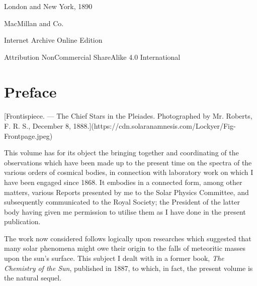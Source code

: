 \documentclass[a4paper, 12pt, oneside, polutonikogreek, english]{article}
\begin{document}
\begin{titlepage}
	
	
		
	\vspace*{\fill}%
	
	London and New York, 1890 %
	
	{\small MacMillan and Co.} %

	\vspace{1\baselineskip} %

        Internet Archive Online Edition  %
	
	{\small Attribution NonCommercial ShareAlike 4.0 International } %
\end{titlepage}
\setlength{\parskip}{1mm plus1mm minus1mm}
\setcounter{tocdepth}{3}
\setcounter{secnumdepth}{3}
\tableofcontents
\clearpage
\listoffigures{}
\clearpage
\section*{Preface}
\paragraph{}
[Frontispiece. --- The Chief Stars in the Pleiades. Photographed by Mr. Roberts, F. R. S., December 8, 1888.](https://cdn.solaranamnesis.com/Lockyer/Fig-Frontpage.jpeg)

This volume has for its object the bringing together and coordinating of the observations which have been made up to the present time on the spectra of the various orders of cosmical bodies, in connection with laboratory work on which I have been engaged since 1868. It embodies in a connected form, among other matters, various Reports presented by me to the Solar Physics Committee, and subsequently communicated to the Royal Society; the President of the latter body having given me permission to utilise them as I have done in the present publication.

The work now considered follows logically upon researches which suggested that many solar phenomena might owe their origin to the falls of meteoritic masses upon the sun's surface. This subject I dealt with in a former book, \emph{The Chemistry of the Sun}, published in 1887, to which, in fact, the present volume is the natural sequel.
\end{document}
